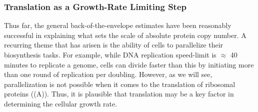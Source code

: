 \subsubsection{Translation as a Growth-Rate Limiting Step}
Thus far, the general back-of-the-envelope estimates have been
reasonably successful in explaining what sets the scale of absolute protein copy
number. A recurring theme that has arisen is the ability of cells to parallelize
their biosynthesis tasks. For example, while DNA replication speed-limit is
$\approx$ 40 minutes to replicate a genome, cells can divide faster than this by
initiating more than one round of replication per doubling. However, as we will
see, parallelization is not possible when it comes to the translation of
ribosomal proteins ((A)). Thus, it is plausible that  translation may be a key factor in
determining the cellular growth rate.


%

